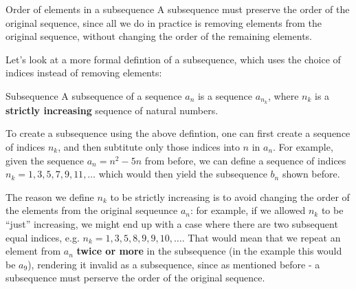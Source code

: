 
\begin{note}{Order of elements in a subsequence}{}
	A subsequence must preserve the order of the original sequence, since all we do in practice is removing elements from the original sequence, without changing the order of the remaining elements.
\end{note}

Let's look at a more formal defintion of a subsequence, which uses the choice of indices instead of removing elements:
\begin{definition}{Subsequence}{}
	A subsequence of a sequence $a_{n}$ is a sequence $a_{n_{k}}$, where $n_{k}$ is a \textbf{strictly increasing} sequence of natural numbers.
\end{definition}

To create a subsequence using the above defintion, one can first create a sequence of indices $n_{k}$, and then subtitute only those indices into $n$ in $a_{n}$. For example, given the sequence $a_{n}=n^{2}-5n$ from before, we can define a sequence of indices $n_{k}=1,3,5,7,9,11,\dots$ which would then yield the subsequence $b_{n}$ shown before.

The reason we define $n_{k}$ to be strictly increasing is to avoid changing the order of the elements from the original sequeunce $a_{n}$: for example, if we allowed $n_{k}$ to be ``just'' increasing, we might end up with a case where there are two subsequent equal indices, e.g. $n_{k}=1,3,5,8,9,9,10,\dots$. That would mean that we repeat an element from $a_{n}$ \textbf{twice or more} in the subsequence (in the example this would be $a_{9}$), rendering it invalid as a subsequence, since as mentioned before - a subsequence must perserve the order of the original sequence.


